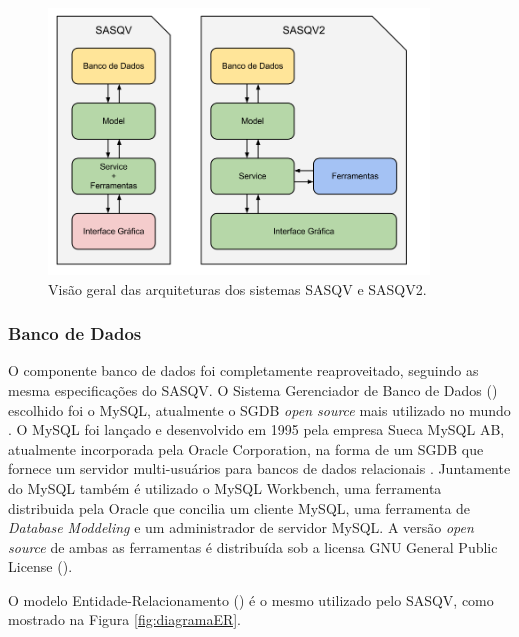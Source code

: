 \begin{figure}[!htb]
	\centering
	\includegraphics[width=0.9\textwidth]{./imgs/arquitetura.png}
	\caption{Visão geral das arquiteturas dos sistemas SASQV e SASQV2.}
	\label{fig:arquitetura}
\end{figure}

\subsubsection{Banco de Dados}

O componente banco de dados foi completamente reaproveitado, seguindo as mesma especificações do SASQV. 
O Sistema Gerenciador de Banco de Dados () escolhido foi o MySQL, atualmente o SGDB \emph{open source} mais utilizado no mundo \cite{mysqlmarket}.
O MySQL foi lançado e desenvolvido em 1995 pela empresa Sueca MySQL AB, atualmente incorporada pela Oracle Corporation, na forma de um SGDB que fornece um servidor multi-usuários para bancos de dados relacionais \cite{wikipediamysql}. 
Juntamente do MySQL também é utilizado o MySQL Workbench, uma ferramenta distribuida pela Oracle que concilia um cliente MySQL, uma ferramenta de \emph{Database Moddeling} e um administrador de servidor MySQL. 
A versão \emph{open source} de ambas as ferramentas é distribuída sob a licensa GNU General Public License ().

O modelo Entidade-Relacionamento () é o mesmo utilizado pelo SASQV, como mostrado na Figura \ref{fig:diagramaER}.

